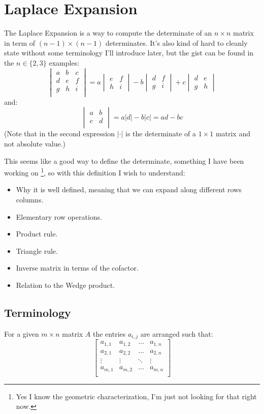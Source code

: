 
\section{Laplace Expansion}
The Laplace Expansion is a way to compute the determinate of an $n\times n$ matrix in term of $(n-1)\times (n-1)$ determinates.
It's also kind of hard to cleanly state without some terminology I'll introduce later,
but the gist can be found in the $n\in\{2,3\}$ examples:
\[\begin{vmatrix} a&b&c\\d&e&f\\g&h&i\\ \end{vmatrix} =
	a\begin{vmatrix} e&f\\h&i\end{vmatrix}
	-b\begin{vmatrix}d&f\\g&i\end{vmatrix}
	+c\begin{vmatrix}d&e\\g&h\end{vmatrix}
\]
and:
\[\begin{vmatrix} a&b\\ c&d\\ \end{vmatrix} = a|d|-b|c| = ad-bc 
\]
(Note that in the second expression $|\cdot|$ is the determinate of a $1\times 1$ matrix and not absolute value.)

This seems like a good way to define the determinate,
something I have been working on
\footnote{Yes I know the geometric characterization, 
I'm just not looking for that right now.},
so with this definition I wish to understand:

\begin{itemize}
	\item Why it is well defined, meaning that we can expand along different rows columns.
	\item Elementary row operations.
	\item Product rule.
	\item Triangle rule.
	\item Inverse matrix in terms of the cofactor.
	\item Relation to the Wedge product.
\end{itemize}

\subsection{Terminology}
For a given $m\times n$ matrix $A$ the entries $a_{i,j}$ are arranged such that:
\[\begin{bmatrix}
	a_{1,1}&a_{1,2}&\dots&a_{1,n} \\
	a_{2,1}&a_{2,2}&\dots&a_{2,n} \\
	\vdots&\vdots&\ddots&\vdots\\
	a_{m,1}&a_{m,2}&\dots&a_{m,n} \\
\end{bmatrix}\]

